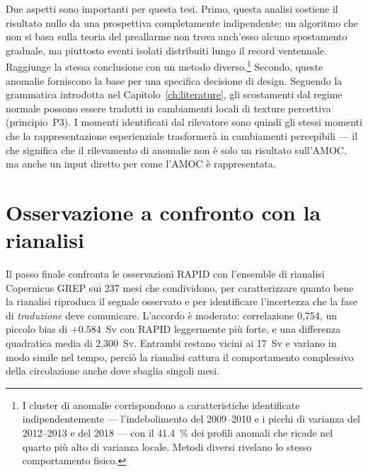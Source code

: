 

Due aspetti sono importanti per questa tesi. Primo, questa analisi sostiene il risultato nullo da una prospettiva completamente indipendente: un algoritmo che non si basa sulla teoria del preallarme non trova anch'esso alcuno spostamento graduale, ma piuttosto eventi isolati distribuiti lungo il record ventennale. Raggiunge la stessa conclusione con un metodo diverso.\footnote{I cluster di anomalie corrispondono a caratteristiche identificate indipendentemente --- l'indebolimento del 2009--2010 e i picchi di varianza del 2012--2013 e del 2018 --- con il \SI{41.4}{\percent} dei profili anomali che ricade nel quarto più alto di varianza locale. Metodi diversi rivelano lo stesso comportamento fisico.} Secondo, queste anomalie forniscono la base per una specifica decisione di design. Seguendo la grammatica introdotta nel Capitolo~\ref{ch:literature}, gli scostamenti dal regime normale possono essere tradotti in cambiamenti locali di texture percettiva (principio~P3). I momenti identificati dal rilevatore sono quindi gli stessi momenti che la rappresentazione esperienziale trasformerà in cambiamenti percepibili --- il che significa che il rilevamento di anomalie non è solo un risultato sull'AMOC, ma anche un input diretto per come l'AMOC è rappresentata.

\section{Osservazione a confronto con la rianalisi}
\label{sec:detect-copernicus}

Il passo finale confronta le osservazioni RAPID con l'ensemble di rianalisi Copernicus GREP sui 237 mesi che condividono, per caratterizzare quanto bene la rianalisi riproduca il segnale osservato e per identificare l'incertezza che la fase di \emph{traduzione} deve comunicare. L'accordo è moderato: correlazione 0,754, un piccolo bias di $+0.584$~Sv con RAPID leggermente più forte, e una differenza quadratica media di 2,300~Sv. Entrambi restano vicini ai 17~Sv e variano in modo simile nel tempo, perciò la rianalisi cattura il comportamento complessivo della circolazione anche dove sbaglia singoli mesi.

